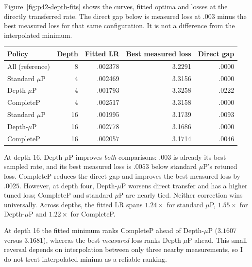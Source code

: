 \documentclass{article}
\begin{document}
Figure~\ref{fig:p42-depth-fits} shows the curves, fitted optima and losses
at the directly transferred rate. The direct gap below is measured loss
at $.003$ minus the best measured loss for that same configuration.
It is not a difference from the interpolated minimum.
\begin{center}
\begin{tabular}{lrrrr}
\toprule
Policy & Depth & Fitted LR & Best measured loss & Direct gap \\
\midrule
All (reference) & 8 & .002378 & 3.2291 & .0000 \\
Standard $\mu$P & 4 & .002469 & 3.3156 & .0000 \\
Depth-$\mu$P & 4 & .001793 & 3.3258 & .0222 \\
CompleteP & 4 & .002517 & 3.3158 & .0000 \\
Standard $\mu$P & 16 & .001995 & 3.1739 & .0093 \\
Depth-$\mu$P & 16 & .002778 & 3.1686 & .0000 \\
CompleteP & 16 & .002057 & 3.1714 & .0046 \\
\bottomrule
\end{tabular}
\end{center}

At depth 16, Depth-$\mu$P improves \emph{both} comparisons: $.003$ is
already its best sampled rate, and its best measured loss is $.0053$
below standard $\mu$P's retuned loss. CompleteP reduces the direct gap
and improves the best measured loss by $.0025$. However, at depth four,
Depth-$\mu$P worsens direct transfer and has a higher tuned loss;
CompleteP and standard $\mu$P are nearly tied. Neither correction wins
universally. Across depths, the fitted LR spans $1.24\times$ for standard
$\mu$P, $1.55\times$ for Depth-$\mu$P and $1.22\times$ for CompleteP.

At depth 16 the fitted minimum ranks CompleteP ahead of Depth-$\mu$P
($3.1607$ versus $3.1681$), whereas the best \emph{measured} loss ranks
Depth-$\mu$P ahead. This small reversal depends on interpolation between
only three nearby measurements, so I do not treat interpolated minima
as a reliable ranking.
\end{document}

